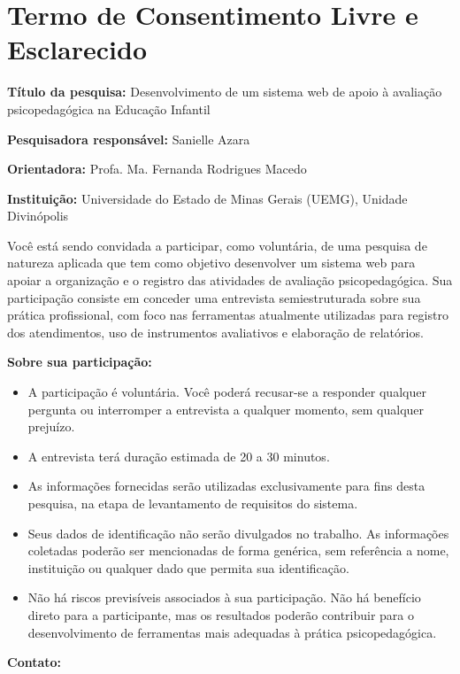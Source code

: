 \chapter{Termo de Consentimento Livre e Esclarecido}
\label{apendice:tcle}

\textbf{Título da pesquisa:} Desenvolvimento de um sistema web de apoio à avaliação psicopedagógica na Educação Infantil

\textbf{Pesquisadora responsável:} Sanielle Azara

\textbf{Orientadora:} Profa. Ma. Fernanda Rodrigues Macedo

\textbf{Instituição:} Universidade do Estado de Minas Gerais (UEMG), Unidade Divinópolis

\bigskip

Você está sendo convidada a participar, como voluntária, de uma pesquisa de natureza aplicada que tem como objetivo desenvolver um sistema web para apoiar a organização e o registro das atividades de avaliação psicopedagógica. Sua participação consiste em conceder uma entrevista semiestruturada sobre sua prática profissional, com foco nas ferramentas atualmente utilizadas para registro dos atendimentos, uso de instrumentos avaliativos e elaboração de relatórios.

\bigskip
\textbf{Sobre sua participação:}

\begin{itemize}
    \item A participação é voluntária. Você poderá recusar-se a responder qualquer pergunta ou interromper a entrevista a qualquer momento, sem qualquer prejuízo.
    \item A entrevista terá duração estimada de 20 a 30 minutos.
    \item As informações fornecidas serão utilizadas exclusivamente para fins desta pesquisa, na etapa de levantamento de requisitos do sistema.
    \item Seus dados de identificação não serão divulgados no trabalho. As informações coletadas poderão ser mencionadas de forma genérica, sem referência a nome, instituição ou qualquer dado que permita sua identificação.
    \item Não há riscos previsíveis associados à sua participação. Não há benefício direto para a participante, mas os resultados poderão contribuir para o desenvolvimento de ferramentas mais adequadas à prática psicopedagógica.
\end{itemize}

\bigskip
\textbf{Contato:}

